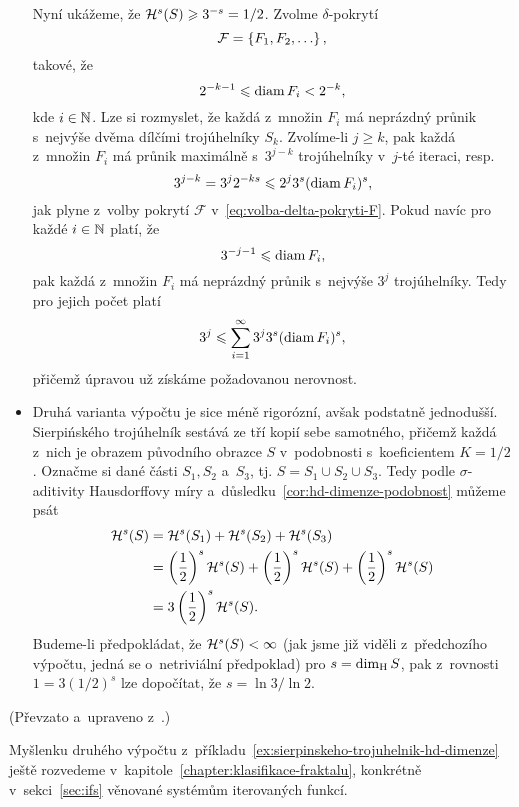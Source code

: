 \begin{example}
\begin{itemize}
        Nyní ukážeme, že $\mathcal{H}^{s}(S)\geqslant 3^{-s}=1/2$. Zvolme $\delta$-pokrytí
        \[\mathcal{F}=\left\{F_1,F_2,\ldots\right\},\]
        takové, že
        \begin{equation}\label{eq:volba-delta-pokryti-F}
            2^{-k-1}\leqslant\operatorname{diam}{F_i}<2^{-k},
        \end{equation}
        kde $i\in\mathbb{N}$. Lze si rozmyslet, že každá z~množin $F_i$ má neprázdný průnik s~nejvýše dvěma dílčími trojúhelníky $S_k$. Zvolíme-li $j\geqslant k$, pak každá z~množin $F_i$ má průnik maximálně s~$3^{j-k}$ trojúhelníky v~$j$-té iteraci, resp.
        \[3^{j-k}=3^j2^{-ks}\leqslant2^j3^s(\operatorname{diam}{F_i})^s,\]
        jak plyne z~volby pokrytí $\mathcal{F}$ v~\eqref{eq:volba-delta-pokryti-F}. Pokud navíc pro každé $i\in\mathbb{N}$ platí, že
        \[3^{-j-1}\leqslant\operatorname{diam}{F_i},\]
        pak každá z~množin $F_i$ má neprázdný průnik s~nejvýše $3^j$ trojúhelníky. Tedy pro jejich počet platí
        \[3^j\leqslant\sum_{i=1}^{\infty}3^j3^s(\operatorname{diam}{F_i})^s,\]
        přičemž úpravou už získáme požadovanou nerovnost.
        \item Druhá varianta výpočtu je sice méně rigorózní, avšak podstatně jednodušší. Sierpińského trojúhelník sestává ze tří kopií sebe samotného, přičemž každá z~nich je obrazem původního obrazce $S$ v~podobnosti s~koeficientem $K=1/2$. Označme si dané části $S_1,S_2$ a~$S_3$, tj. $S=S_1\cup S_2\cup S_3$. Tedy podle $\sigma$-aditivity Hausdorffovy míry a~důsledku~\ref{cor:hd-dimenze-podobnost} můžeme psát
        \begin{align*}
            \mathcal{H}^{s}(S)&=\mathcal{H}^{s}(S_1)+\mathcal{H}^{s}(S_2)+\mathcal{H}^{s}(S_3)\\
            &=\left(\dfrac{1}{2}\right)^s\mathcal{H}^{s}(S)+\left(\dfrac{1}{2}\right)^s\mathcal{H}^{s}(S)+\left(\dfrac{1}{2}\right)^s\mathcal{H}^{s}(S)\\
            &=3\left(\dfrac{1}{2}\right)^s\mathcal{H}^{s}(S).
        \end{align*}
        Budeme-li předpokládat, že $\mathcal{H}^{s}(S)<\infty$ (jak jsme již viděli z~předchozího výpočtu, jedná se o~netriviální předpoklad) pro $s=\operatorname{dim_H}{S}$, pak z~rovnosti $1=3(1/2)^s$ lze dopočítat, že $s=\ln{3}/\ln{2}$.
    \end{itemize}
\end{example}
(Převzato a~upraveno z~\citep[str. 53]{Falconer2014}.)

Myšlenku druhého výpočtu z~příkladu~\ref{ex:sierpinskeho-trojuhelnik-hd-dimenze} ještě rozvedeme v~kapitole~\ref{chapter:klasifikace-fraktalu}, konkrétně v~sekci~\ref{sec:ifs} věnované systémům iterovaných funkcí.


